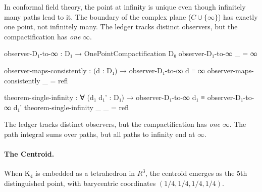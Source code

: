 \documentclass[11pt,a4paper]{book}
\def\mathbb#1{#1}%
\begin{document}
In conformal field theory, the point at infinity is unique even though infinitely 
many paths lead to it. The boundary of the complex plane ($\mathbb{C} \cup \{\infty\}$) 
has exactly one point, not infinitely many. The ledger tracks distinct observers, 
but the compactification has \emph{one} $\infty$.

\begin{code}
observer-D₁-to-∞ : D₁ → OnePointCompactification D₀
observer-D₁-to-∞ _ = ∞

observer-maps-consistently : (d : D₁) → observer-D₁-to-∞ d ≡ ∞
observer-maps-consistently _ = refl

theorem-single-infinity : ∀ (d₁ d₁' : D₁) → observer-D₁-to-∞ d₁ ≡ observer-D₁-to-∞ d₁'
theorem-single-infinity _ _ = refl
\end{code}

The ledger tracks distinct observers, but the compactification has \emph{one} 
$\infty$. The path integral sums over paths, but all paths to infinity end at $\infty$.

\paragraph{The Centroid.}
When K$_4$ is embedded as a tetrahedron in $\mathbb{R}^3$, the centroid emerges as 
the 5th distinguished point, with barycentric coordinates $(1/4, 1/4, 1/4, 1/4)$.
\end{document}
